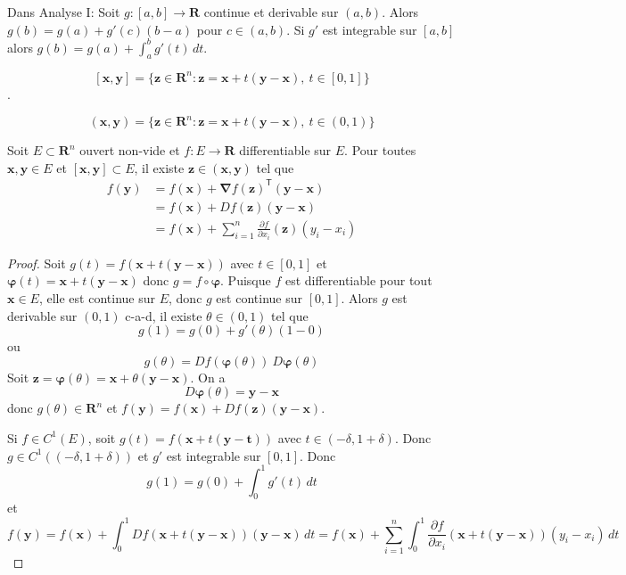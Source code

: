 
\begin{reminder}
Dans Analyse I: Soit $g:[a,b]\to \mathbf{R}$ continue et derivable sur $(a,b)$. Alors $g(b)=g(a)+g'(c)(b-a)$ pour $c\in(a,b)$. Si $g'$ est integrable sur $[a,b]$ alors $g(b)=g(a)+\int_{a}^{b} g'(t) \, dt$.
\end{reminder}
\begin{notation}
$$[\boldsymbol{x},\boldsymbol{y}]=\{ \boldsymbol{z}\in \mathbf{R}^{n}:\boldsymbol{z}=\boldsymbol{x}+t(\boldsymbol{y}-\boldsymbol{x}),~t\in[0,1] \}$$.
\end{notation}
\begin{notation}
$$(\boldsymbol{x},\boldsymbol{y})=\{ \boldsymbol{z}\in \mathbf{R}^{n}:\boldsymbol{z}=\boldsymbol{x}+t(\boldsymbol{y}-\boldsymbol{x}),~t\in(0,1) \}$$\end{notation}
\begin{theorem}
Soit $E\subset \mathbf{R}^{n}$ ouvert non-vide et $f:E\to \mathbf{R}$ differentiable sur $E$. Pour toutes $\boldsymbol{x},\boldsymbol{y}\in E$ et $[\boldsymbol{x},\boldsymbol{y}]\subset E$, il existe $\boldsymbol{z}\in (\boldsymbol{x},\boldsymbol{y})$ tel que 
\begin{align*}
f(\boldsymbol{y}) & =f(\boldsymbol{x})+\boldsymbol{\nabla}f(\boldsymbol{z})^{\mathsf{T}}(\boldsymbol{y}-\boldsymbol{x}) \\
 & =f(\boldsymbol{x})+Df(\boldsymbol{z})(\boldsymbol{y}-\boldsymbol{x}) \\
 & =f(\boldsymbol{x})+\sum_{i=1}^{n}  \frac{ \partial f }{ \partial x_{i} } (\boldsymbol{z})(y_{i}-x_{i})
\end{align*}
\end{theorem}

\begin{proof}
Soit $g(t)=f(\boldsymbol{x}+t(\boldsymbol{y}-\boldsymbol{x}))$ avec $t\in[0,1]$ et $\boldsymbol{\varphi}(t)=\boldsymbol{x}+t(\boldsymbol{y}-\boldsymbol{x})$ donc $g=f\circ \boldsymbol{\varphi}$. Puisque $f$ est differentiable pour tout $\boldsymbol{x}\in E$, elle est continue sur $E$, donc $g$ est continue sur $[0,1]$. Alors $g$ est derivable sur $(0,1)$ c-a-d, il existe $\theta \in(0,1)$ tel que 
$$
g(1)=g(0)+g'(\theta)(1-0)
$$
ou 
$$
g(\theta)=Df(\boldsymbol{\varphi}(\theta))~D\boldsymbol{\varphi}(\theta)
$$
Soit $\boldsymbol{z}=\boldsymbol{\varphi}(\theta)=\boldsymbol{x}+\theta(\boldsymbol{y}-\boldsymbol{x})$. On a 
$$
D\boldsymbol{\varphi}(\theta)=\boldsymbol{y}-\boldsymbol{x}
$$
donc $g(\theta)\in \mathbf{R}^{n}$ et $f(\boldsymbol{y})=f(\boldsymbol{x})+Df(\boldsymbol{z})(\boldsymbol{y}-\boldsymbol{x})$.

Si $f\in C^{1}(E)$, soit $g(t)=f(\boldsymbol{x}+t(\boldsymbol{y}-\boldsymbol{t}))$ avec $t\in(-\delta,1+\delta)$. Donc $g\in C^{1}((-\delta,1+\delta))$ et $g'$ est integrable sur $[0,1]$. Donc
$$
g(1)=g(0)+\int_{0}^{1} g'(t) \, dt
$$
et
$$
f(\boldsymbol{y})=f(\boldsymbol{x})+\int_{0}^{1} Df(\boldsymbol{x}+t(\boldsymbol{y}-\boldsymbol{x}))(\boldsymbol{y}-\boldsymbol{x}) \, dt=f(\boldsymbol{x})+\sum_{i=1}^{n} \int_{0}^{1} \frac{ \partial f }{ \partial x_{i} } (\boldsymbol{x}+t(\boldsymbol{y}-\boldsymbol{x}))(y_{i}-x_{i}) \, dt  
$$
\end{proof}

